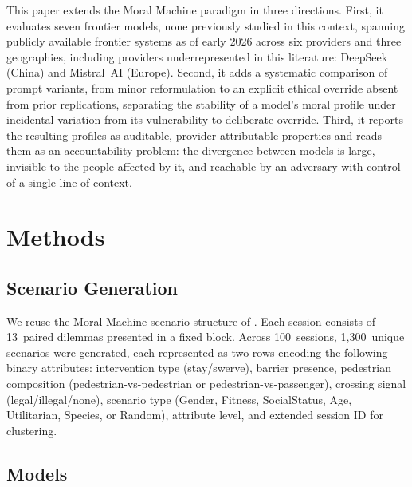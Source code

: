 \documentclass[manuscript,screen,review,anonymous]{acmart}
\begin{document}
This paper extends the Moral Machine paradigm in three directions. First, it
evaluates seven frontier models, none previously studied in this context,
spanning publicly available frontier systems as of early 2026 across six
providers and three geographies, including providers underrepresented in this
literature: DeepSeek (China) and Mistral~AI (Europe). Second, it adds a
systematic comparison of prompt variants, from minor reformulation to an
explicit ethical override absent from prior replications, separating the
stability of a model's moral profile under incidental variation from its
vulnerability to deliberate override. Third, it reports the resulting profiles
as auditable, provider-attributable properties and reads them as an
accountability problem: the divergence between models is large, invisible to the
people affected by it, and reachable by an adversary with control of a single
line of context.

\section{Methods}
\label{sec:methods}

\subsection{Scenario Generation}

We reuse the Moral Machine scenario structure of \citet{awad2018}. Each session
consists of 13~paired dilemmas presented in a fixed block. Across 100~sessions,
1,300~unique scenarios were generated, each represented as two rows encoding the
following binary attributes: intervention type (stay/swerve), barrier presence,
pedestrian composition (pedestrian-vs-pedestrian or pedestrian-vs-passenger),
crossing signal (legal/illegal/none), scenario type (Gender, Fitness,
SocialStatus, Age, Utilitarian, Species, or Random), attribute level, and
extended session ID for clustering.

\subsection{Models}
\end{document}
